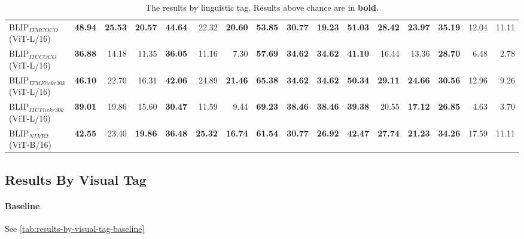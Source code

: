 \begin{table}[ht]
\begin{adjustbox}{max width=\textwidth}
\begin{tabular}{l|rrr|rrr|rrr|rrr|rrr}
 BLIP$_{ITM COCO}$ (ViT-L/16)        & \textbf{48.94} & \textbf{25.53} & \textbf{20.57} & \textbf{44.64} & 22.32          & \textbf{20.60} & \textbf{53.85} & \textbf{30.77} & \textbf{19.23} & \textbf{51.03} & \textbf{28.42} & \textbf{23.97} & \textbf{35.19} & 12.04          & 11.11          \\
 BLIP$_{ITC COCO}$ (ViT-L/16)        & \textbf{36.88} & 14.18          & 11.35          & \textbf{36.05} & 11.16          & 7.30           & \textbf{57.69} & \textbf{34.62} & \textbf{34.62} & \textbf{41.10} & 16.44          & 13.36          & \textbf{28.70} & 6.48           & 2.78           \\
 BLIP$_{ITM Flickr30k}$ (ViT-L/16)   & \textbf{46.10} & 22.70          & 16.31          & \textbf{42.06} & 24.89          & \textbf{21.46} & \textbf{65.38} & \textbf{34.62} & \textbf{34.62} & \textbf{50.34} & \textbf{29.11} & \textbf{24.66} & \textbf{30.56} & 12.96          & 9.26           \\
 BLIP$_{ITC Flickr30k}$ (ViT-L/16)   & \textbf{39.01} & 19.86          & 15.60          & \textbf{30.47} & 11.59          & 9.44           & \textbf{69.23} & \textbf{38.46} & \textbf{38.46} & \textbf{39.38} & 20.55          & \textbf{17.12} & \textbf{26.85} & 4.63           & 3.70           \\
 BLIP$_{NLVR2}$ (ViT-B/16)           & \textbf{42.55} & 23.40          & \textbf{19.86} & \textbf{36.48} & \textbf{25.32} & \textbf{16.74} & \textbf{61.54} & \textbf{30.77} & \textbf{26.92} & \textbf{42.47} & \textbf{27.74} & \textbf{21.23} & \textbf{34.26} & 17.59          & 11.11    \\
          \bottomrule
  \end{tabular}
  \end{adjustbox}
  \caption{The results by linguistic tag. Results above chance are in \textbf{bold}.}
    \label{tab:results-by-ling-tag-ours}
\end{table}

\subsection{Results By Visual Tag}

\paragraph{Baseline}

See \cref{tab:results-by-visual-tag-baseline}

